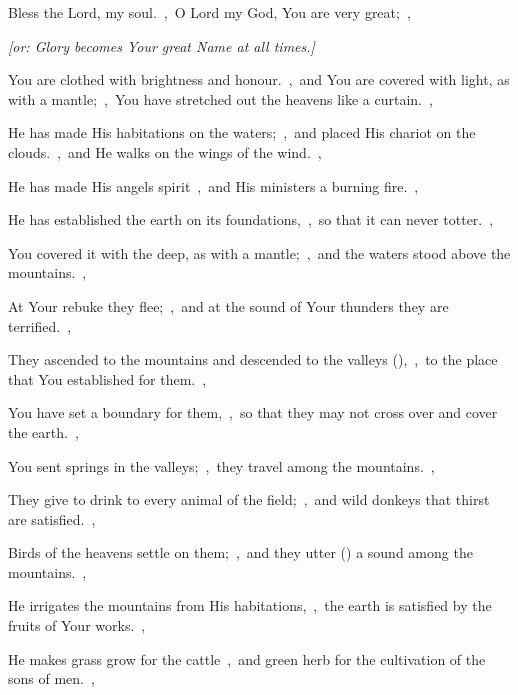 \documentclass[12pt,twoside,a5paper]{article}
\begin{document}



\begin{normalparskip}
  Bless the Lord, my soul.~\sep\ O Lord my God, You are very great;~\sep


  \emph{[or: Glory becomes Your great Name at all times.]}

  You are clothed with brightness and honour.~\sep\ and You are covered with light, as with a mantle;~\sep\ You have stretched out the heavens like a curtain.~\sep

  He has made His habitations on the waters;~\sep\ and placed His chariot on the clouds.~\sep\ and He walks on the wings of the wind.~\sep

  He has made His angels spirit~\sep\ and His ministers a burning fire.~\sep

  He has established the earth on its foundations,~\sep\ so that it can never totter.~\sep

  You covered it with the deep, as with a mantle;~\sep\ and the waters stood above the mountains.~\sep

  At Your rebuke they flee;~\sep\ and at the sound of Your thunders they are terrified.~\sep

  They ascended to the mountains and descended to the valleys (),~\sep\ to the place that You established for them.~\sep

  You have set a boundary for them,~\sep\ so that they may not cross over and cover the earth.~\sep

  You sent springs in the valleys;~\sep\ they travel among the mountains.~\sep

  They give to drink to every animal of the field;~\sep\ and wild donkeys that thirst are satisfied.~\sep

  Birds of the heavens settle on them;~\sep\ and they utter () a sound among the mountains.~\sep

  He irrigates the mountains from His habitations,~\sep\ the earth is satisfied by the fruits of Your works.~\sep

  He makes grass grow for the cattle~\sep\ and green herb for the cultivation of the sons of men.~\sep


\end{normalparskip}
\end{document}

